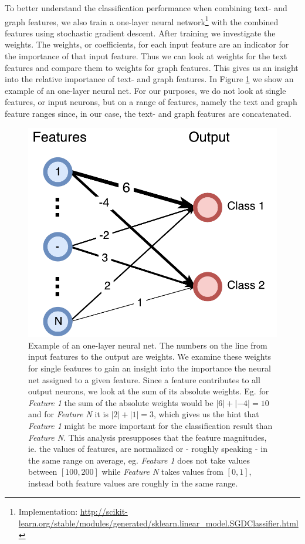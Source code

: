 
To better understand the classification performance when combining text- and graph features, we also train a one-layer neural network\footnote{Implementation: \url{http://scikit-learn.org/stable/modules/generated/sklearn.linear_model.SGDClassifier.html}} with the combined features using stochastic gradient descent. After training we investigate the weights.
The weights, or coefficients, for each input feature are an indicator for the importance of that input feature.
Thus we can look at weights for the text features and compare them to weights for graph features.
This gives us an insight into the relative importance of text- and graph features.
In Figure \ref{fig:coefs_example_one_layer} we show an example of an one-layer neural net.
For our purposes, we do not look at single features, or input neurons, but on a range of features, namely the text and graph feature ranges since, in our case, the text- and graph features are concatenated.

\begin{figure}[htb!]
	\centering
	{\includegraphics[width=0.5\linewidth]{assets/figures/coefs_example.pdf}%
		\caption[Example: One-layer neural net]{%
			Example of an one-layer neural net. The numbers on the line from input features to the output are weights.
			We examine these weights for single features to gain an insight into the importance the neural net assigned to a given feature. Since a feature contributes to all output neurons, we look at the sum of its absolute weights. Eg. for \textit{Feature 1} the sum of the absolute weights would be $|6| + |-4| = 10$ and for \textit{Feature N} it is $|2| + |1| = 3$, which gives us the hint that \textit{Feature 1} might be more important for the classification result than \textit{Feature N}.
			This analysis presupposes that the feature magnitudes, ie. the values of features, are normalized or - roughly speaking - in the same range on average, eg. \textit{Feature 1} does not take values between $[100, 200]$ while \textit{Feature N} takes values from $[0, 1]$, instead both feature values are roughly in the same range.
		}%
		\label{fig:coefs_example_one_layer}}
\end{figure}

